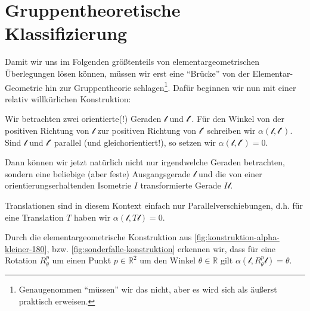 \documentclass[a4paper, ngerman]{article}
\numberwithin{equation}{chapter}
\theoremstyle{plain}
\theoremstyle{definition}
\begin{document}
\section{Gruppentheoretische Klassifizierung}\label{sec:gruppentheo-klassifikation}
Damit wir uns im Folgenden größtenteils von elementargeometrischen Überlegungen lösen können, müssen wir erst eine "`Brücke"' von der Elementar-Geometrie hin zur Gruppentheorie schlagen\footnote{Genaugenommen "`müssen"' wir das nicht, aber es wird sich als äußerst praktisch erweisen.}. Dafür beginnen wir nun mit einer relativ willkürlichen Konstruktion:

Wir betrachten zwei orientierte(!) Geraden \(\mathscr l\) und \(\mathscr l'\). Für den Winkel von der positiven Richtung von \(\mathscr l\) zur positiven Richtung von \(\mathscr l'\) schreiben wir \(\alpha(\mathscr l, \mathscr l')\). Sind \(\mathscr l\) und \(\mathscr l'\) parallel (und gleichorientiert!), so setzen wir \(\alpha(\mathscr l, \mathscr l') = 0\). 

Dann können wir jetzt natürlich nicht nur irgendwelche Geraden betrachten, sondern eine beliebige (aber feste) Ausgangsgerade \(\mathscr l\) und die von einer orientierungserhaltenden Isometrie \(I\) transformierte Gerade \(I\mathscr l \). 

Translationen sind in diesem Kontext einfach nur Parallelverschiebungen, d.h. für eine Translation \(T\) haben wir \(\alpha(\mathscr l, T\mathscr l) = 0\). 

Durch die elementargeometrische Konstruktion aus \cref{fig:konstruktion-alpha-kleiner-180}, bzw. \cref{fig:sonderfalle-konstruktion} erkennen wir, dass für eine Rotation \(R_\theta^p\) um einen Punkt \(p\in \mathbb R^2\) um den Winkel \(\theta\in \mathbb R\) gilt \(\alpha(\mathscr l, R_\theta^p\mathscr l) = \theta\). 
\end{document}
